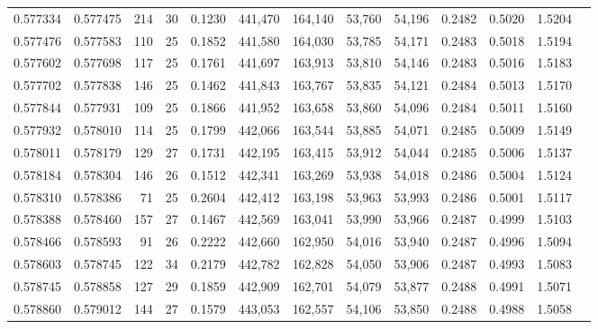 \begin{tabular}{rrrrrrrrrrrrr}
0.577334 & 0.577475 &   214 &  30 &                                     0.1230 & 441,470 & 164,140 &  53,760 &  54,196 & 0.2482 & 0.5020 & 1.5204 \\
0.577476 & 0.577583 &   110 &  25 &                                     0.1852 & 441,580 & 164,030 &  53,785 &  54,171 & 0.2483 & 0.5018 & 1.5194 \\
0.577602 & 0.577698 &   117 &  25 &                                     0.1761 & 441,697 & 163,913 &  53,810 &  54,146 & 0.2483 & 0.5016 & 1.5183 \\
0.577702 & 0.577838 &   146 &  25 &                                     0.1462 & 441,843 & 163,767 &  53,835 &  54,121 & 0.2484 & 0.5013 & 1.5170 \\
0.577844 & 0.577931 &   109 &  25 &                                     0.1866 & 441,952 & 163,658 &  53,860 &  54,096 & 0.2484 & 0.5011 & 1.5160 \\
0.577932 & 0.578010 &   114 &  25 &                                     0.1799 & 442,066 & 163,544 &  53,885 &  54,071 & 0.2485 & 0.5009 & 1.5149 \\
0.578011 & 0.578179 &   129 &  27 &                                     0.1731 & 442,195 & 163,415 &  53,912 &  54,044 & 0.2485 & 0.5006 & 1.5137 \\
0.578184 & 0.578304 &   146 &  26 &                                     0.1512 & 442,341 & 163,269 &  53,938 &  54,018 & 0.2486 & 0.5004 & 1.5124 \\
0.578310 & 0.578386 &    71 &  25 &                                     0.2604 & 442,412 & 163,198 &  53,963 &  53,993 & 0.2486 & 0.5001 & 1.5117 \\
0.578388 & 0.578460 &   157 &  27 &                                     0.1467 & 442,569 & 163,041 &  53,990 &  53,966 & 0.2487 & 0.4999 & 1.5103 \\
0.578466 & 0.578593 &    91 &  26 &                                     0.2222 & 442,660 & 162,950 &  54,016 &  53,940 & 0.2487 & 0.4996 & 1.5094 \\
0.578603 & 0.578745 &   122 &  34 &                                     0.2179 & 442,782 & 162,828 &  54,050 &  53,906 & 0.2487 & 0.4993 & 1.5083 \\
0.578745 & 0.578858 &   127 &  29 &                                     0.1859 & 442,909 & 162,701 &  54,079 &  53,877 & 0.2488 & 0.4991 & 1.5071 \\
0.578860 & 0.579012 &   144 &  27 &                                     0.1579 & 443,053 & 162,557 &  54,106 &  53,850 & 0.2488 & 0.4988 & 1.5058 \\

\end{tabular}
